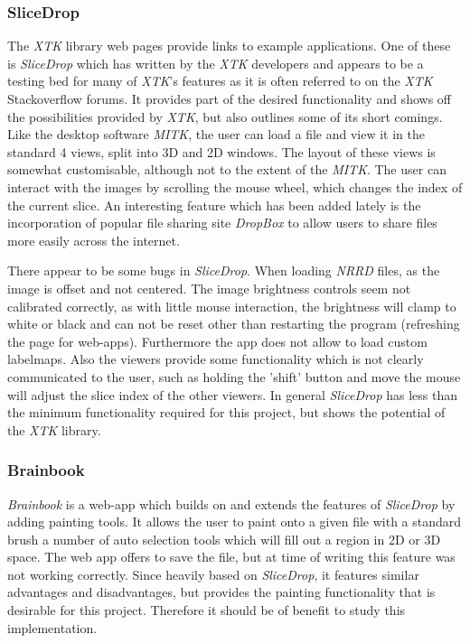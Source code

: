 \documentclass[a4paper,11pt,twoside]{article}
\begin{document}
\subsubsection{SliceDrop}
The \textit{XTK} library web pages provide links to example applications. One of these is \textit{SliceDrop}\cite{slicedrop} which has written by the \textit{XTK} developers and appears to be a testing bed for many of \textit{XTK}'s features as it is often referred to on the \textit{XTK} Stackoverflow forums. It provides part of the desired functionality and shows off the possibilities provided by \textit{XTK}, but also outlines some of its short comings. Like the desktop software \textit{MITK}, the user can load a file and view it in the standard 4 views, split into 3D and 2D windows. The layout of these views is somewhat customisable, although not to the extent of the \textit{MITK}. The user can interact with the images by scrolling the mouse wheel, which changes the index of the current slice. An interesting feature which has been added lately is the incorporation of popular file sharing site \textit{DropBox} to allow users to share files more easily across the internet.

There appear to be some bugs in \textit{SliceDrop}. When loading \textit{NRRD} files, as the image is offset and not centered. The image brightness controls seem not calibrated correctly, as with little mouse interaction, the brightness will clamp to white or black and can not be reset other than restarting the program (refreshing the page for web-apps). Furthermore the app does not allow to load custom labelmaps. Also the viewers provide some functionality which is not clearly communicated to the user, such as holding the 'shift' button and move the mouse will adjust the slice index of the other viewers. In general \textit{SliceDrop} has less than the minimum functionality required for this project, but shows the potential of the \textit{XTK} library. 


\subsubsection{Brainbook}
\textit{Brainbook}\cite{brainbook} is a web-app which builds on and extends the features of \textit{SliceDrop} by adding painting tools. It allows the user to paint onto a given file with a standard brush a number of auto selection tools which will fill out a region in 2D or 3D space. The web app offers to save the file, but at time of writing this feature was not working correctly. Since heavily based on \textit{SliceDrop}, it features similar advantages and disadvantages, but provides the painting functionality that is desirable for this project. Therefore it should be of benefit to study this implementation.
\end{document}
